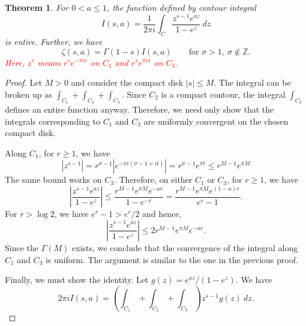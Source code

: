 \documentclass[12pt]{article}
\theoremstyle{thmstyle}
\newtheorem{theorem}{Theorem}[section]
\theoremstyle{defstyle}
\newcommand{\Z}{\mathbb{Z}}
\newcommand{\caution}[1]{\textcolor{red}{\textit{#1}}}
\renewcommand{\le}{\leqslant}
\renewcommand{\ge}{\geqslant}
\begin{document}
\begin{theorem}
    For $0 < a \le 1$, the function defined by contour integral 
    \begin{equation*}
        I(s, a) = \frac{1}{2\pi i}\int_C\frac{z^{s - 1}e^{az}}{1 - e^z}~dz
    \end{equation*}
    is entire. Further, we have 
    \begin{equation*}
        \zeta(s, a) = \Gamma(1 - s)I(s, a) \qquad\text{for }\sigma > 1,~\sigma\notin\Z.
    \end{equation*}
    \caution{Here, $z^s$ means $r^se^{-\pi is}$ on $C_1$ and $r^se^{\pi i s}$ on $C_3$.}
\end{theorem}
\begin{proof}
    Let $M > 0$ and consider the compact disk $|s|\le M$. The integral can be broken up as $\int_{C_1} + \int_{C_2} + \int_{C_3}$. Since $C_2$ is a compact contour, the integral $\int_{C_2}$ defines an entire function anyway. Therefore, we need only show that the integrals corresponding to $C_1$ and $C_3$ are uniformly convergent on the chosen compact disk.

    Along $C_1$, for $r\ge 1$, we have 
    \begin{equation*}
        |z^{s - 1}| = r^{\sigma - 1}\left|e^{-\pi i(\sigma - 1 + it)}\right| = r^{\sigma - 1}e^{\pi t}\le r^{M - 1}e^{\pi M}
    \end{equation*}
    The same bound works on $C_3$. Therefore, on either $C_1$ or $C_3$, for $r\ge 1$, we have 
    \begin{equation*}
        \left|\frac{z^{s - 1}e^{az}}{1 - e^z}\right|\le\frac{r^{M - 1}e^{\pi M}e^{-ar}}{1 - e^{-r}} = \frac{r^{M - 1}e^{\pi M}e^{(1 - a)r}}{e^{r} - 1}.
    \end{equation*}
    For $r > \log 2$, we have $e^{r} - 1 > e^r/2$ and hence, 
    \begin{equation*}
        \left|\frac{z^{s - 1}e^{az}}{1 - e^z}\right|\le 2r^{M - 1}e^{\pi M}e^{-ar}.
    \end{equation*}
    Since the $\Gamma(M)$ exists, we conclude that the convergence of the integral along $C_1$ and $C_3$ is uniform. The argument is similar to the one in the previous proof.

    Finally, we must show the identity. Let $g(z) = e^{az}/(1 - e^z)$. We have 
    \begin{equation*}
        2\pi i I(s, a) = \left(\int_{C_1} + \int_{C_2} + \int_{C_3}\right)z^{s - 1}g(z)~dz.
    \end{equation*}


\end{proof}
\end{document}
